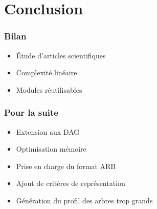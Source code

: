 \section{Conclusion}

\begin{frame}
	\frametitle{Bilan}
	\begin{itemize}
		\item Étude d'articles scientifiques
		\item Complexité linéaire
		\item Modules réutilisables
	\end{itemize}
\end{frame}

\begin{frame}
	\frametitle{Pour la suite}
	\begin{itemize}
		\item Extension aux DAG
		\item Optimisation mémoire
		\item Prise en charge du format ARB
		\item Ajout de critères de représentation %
		\item Génération du profil des arbres trop grands
	\end{itemize}
\end{frame}


